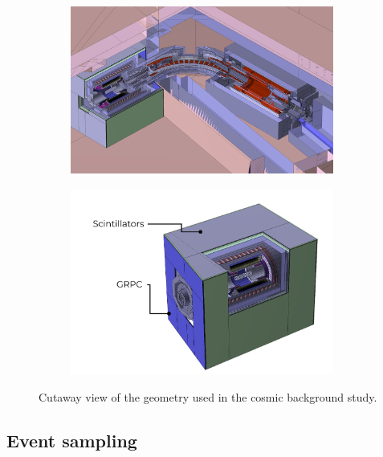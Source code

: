 \begin{figure}
    \centering
    \begin{subfigure}{0.45\textwidth}
        \includegraphics[width=0.95\textwidth]{chapter5/geometry.png}
    \end{subfigure}
    \hfill
    \begin{subfigure}{0.45\textwidth}
        \includegraphics[width=0.95\textwidth]{chapter5/crv_geom.png}
    \end{subfigure}
    \caption{Cutaway view of the geometry used in the cosmic background study.}
    \label{fig:bmc_geometry}
\end{figure}

\subsection{Event sampling}

